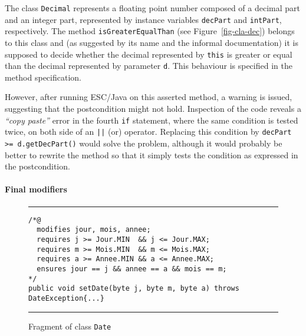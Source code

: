 \documentclass[a4paper]{llncs}
\begin{document}
The class \texttt{Decimal} 
represents a floating point number 
composed of a decimal part and an integer part,
represented by instance variables \texttt{decPart}
and \texttt{intPart}, respectively. The
method \texttt{isGreaterEqualThan} (see Figure~\ref{fig-cla-dec})
belongs to this class and (as suggested by its name and the informal
documentation) it is supposed to decide whether the
decimal represented by \texttt{this} is greater or equal than the
decimal represented by parameter
\texttt{d}. This behaviour is specified in the method specification.

However, after running ESC/Java on this asserted method, a warning is
issued, suggesting that the postcondition
might not hold. Inspection of the code reveals a
\emph{``copy paste''} error in the fourth \texttt{if} statement, where 
the same condition is tested twice, on both side of an \texttt{||}
(or) operator. Replacing this condition 
by \texttt{decPart >= d.getDecPart()} would solve the problem,
although it would probably be better to rewrite the method so that it
simply tests the condition as expressed in the postcondition.







\paragraph{Final modifiers}

\begin{figure}[t]
\rule{\linewidth}{0.3mm}
\begin{verbatim}
/*@
  modifies jour, mois, annee;
  requires j >= Jour.MIN  && j <= Jour.MAX;
  requires m >= Mois.MIN  && m <= Mois.MAX;
  requires a >= Annee.MIN && a <= Annee.MAX;
  ensures jour == j && annee == a && mois == m;
*/
public void setDate(byte j, byte m, byte a) throws DateException{...} 
\end{verbatim}
\caption{Fragment of class {\tt Date}}
\label{fig-cla-dat}
\rule{\linewidth}{0.3mm}
\end{figure}
\end{document}
